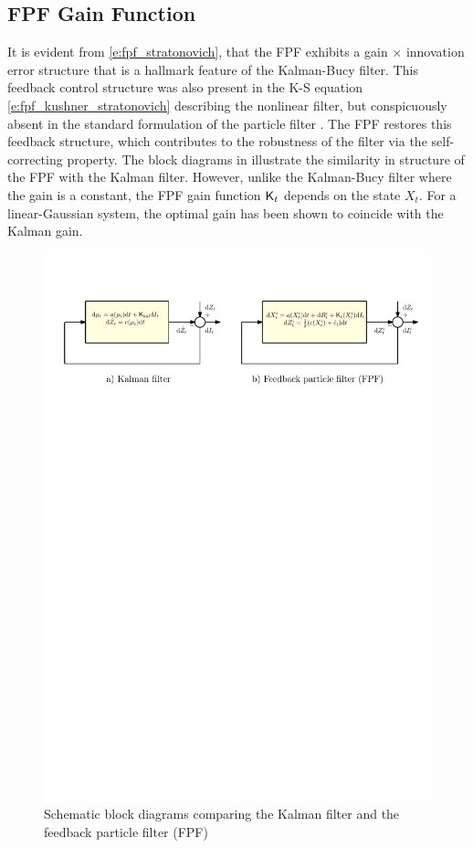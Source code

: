 \subsection{FPF Gain Function}
\label{s:fpf_gain}
It is evident from \eqref{e:fpf_stratonovich}, that the FPF exhibits a gain $\times$ innovation error structure that is a hallmark feature of the Kalman-Bucy filter. This feedback control structure was also present in the K-S equation \eqref{e:fpf_kushner_stratonovich} describing the nonlinear filter, but conspicuously absent in the standard formulation of the particle filter . The FPF restores this feedback structure, which contributes to the robustness of the filter via the self-correcting property.  The block diagrams in  illustrate the similarity in structure of the FPF with the Kalman filter. However, unlike the Kalman-Bucy filter where the gain is a constant, the FPF gain function $\text{\sf K}_t$ depends on the state $X_t$. For a linear-Gaussian system, the optimal gain has been shown to coincide with the Kalman gain. 
\begin{figure}[htbp]
	\centering
		\includegraphics[width = 7in]{images/Chap4_FPF_Kalman}
		\caption{Schematic block diagrams comparing the Kalman filter and the feedback particle filter (FPF) \cite{yanmehmey13}}
		\label{fig:fpf_kalman}
\end{figure}


